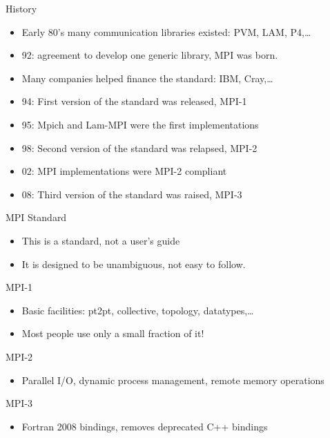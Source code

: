 \documentclass[aspectratio=43]{beamer}
\begin{document}
\begin{frame}{History}
\begin{itemize}
\item Early 80's many communication libraries existed: PVM, LAM, P4,\ldots
\item 92: agreement to develop one generic library, MPI was born.
\item Many companies helped finance the standard: IBM, Cray,\ldots
\item 94: First version of the standard was released, MPI-1
\item 95: Mpich and Lam-MPI were the first implementations
\item 98: Second version of the standard was relapsed, MPI-2
\item 02: MPI implementations were MPI-2 compliant
\item 08: Third version of the standard was raised, MPI-3
\end{itemize}
\end{frame}

\begin{frame}{MPI Standard}
\begin{itemize}
\item This is a standard, not a user’s guide
\item It is designed to be unambiguous, not easy to follow.
\end{itemize}

\begin{blue2block}{MPI-1}
\begin{itemize}
\item Basic facilities: pt2pt, collective, topology, datatypes,\ldots
\item Most people use only a small fraction of it!
\end{itemize}
\end{blue2block}

\begin{blue2block}{MPI-2}
\begin{itemize}
\item Parallel I/O, dynamic process management, remote memory operations
\end{itemize}
\end{blue2block}

\begin{blue2block}{MPI-3}
\begin{itemize}
\item Fortran 2008 bindings, removes deprecated C++ bindings
\end{itemize}
\end{blue2block}

\end{frame}
\end{document}
